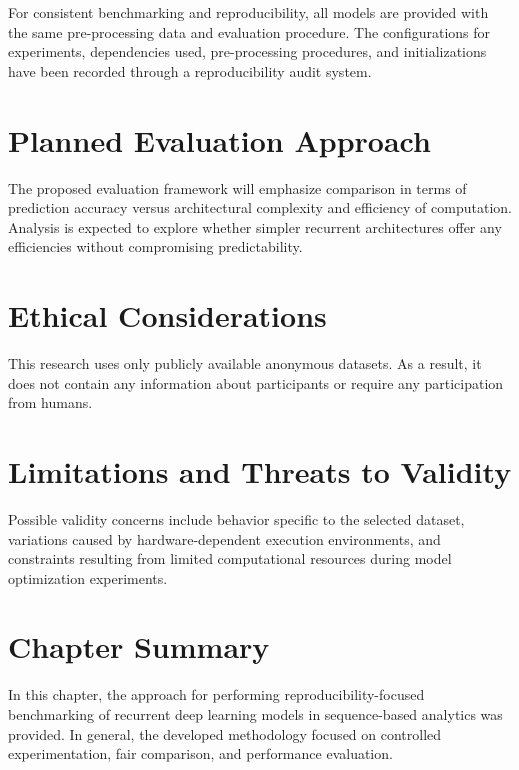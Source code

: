 \documentclass[12pt]{report}
\begin{document}
For consistent benchmarking and reproducibility, all models are provided with the same pre-processing data and evaluation procedure. The configurations for experiments, dependencies used, pre-processing procedures, and initializations have been recorded through a reproducibility audit system.


\section{Planned Evaluation Approach}

The proposed evaluation framework will emphasize comparison in terms of prediction accuracy versus architectural complexity and efficiency of computation. Analysis is expected to explore whether simpler recurrent architectures offer any efficiencies without compromising predictability.


\section{Ethical Considerations}

This research uses only publicly available anonymous datasets. As a result, it does not contain any information about participants or require any participation from humans.


\section{Limitations and Threats to Validity}

Possible validity concerns include behavior specific to the selected dataset, variations caused by hardware-dependent execution environments, and constraints resulting from limited computational resources during model optimization experiments.


\section{Chapter Summary}

In this chapter, the approach for performing reproducibility-focused benchmarking of recurrent deep learning models in sequence-based analytics was provided. In general, the developed methodology focused on controlled experimentation, fair comparison, and performance evaluation.



\clearpage
{}
{}
\end{document}
